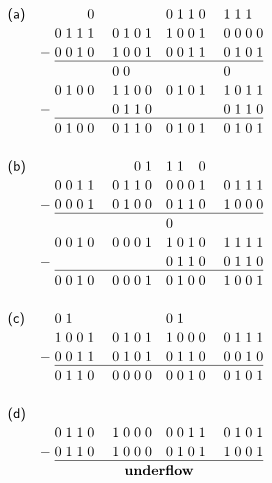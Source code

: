 \[
\setlength\extrarowheight{4pt}
\renewcommand\arraystretch{0.85}
\begin{array}{lr@{\;}c@{\;}c@{\;}c@{\;}c@{\;}cc@{\;}c@{\;}c@{\;}cc@{}c@{\;}c@{\;}c@{\;}c@{\;}cc@{\;}c@{\;}c@{\;}c@{}}
\textsf{(a)} &   &  & & &0 & &  & & &  & & 0&1&1&0 & & 1&1&1&\\
             &   & 0&1&1&1 & & 0&1&0&1 & & 1&0&0&1 & & 0&0&0&0\\
             & - & 0&0&1&0 & & 1&0&0&1 & & 0&0&1&1 & & 0&1&0&1\\
\cline{3-21}
             &   &  & & &  & & 0&0& &  & &  & & &  & & 0& & &\\
             &   & 0&1&0&0 & & 1&1&0&0 & & 0&1&0&1 & & 1&0&1&1\\
             & - &  & & &  & & 0&1&1&0 & &  & & &  & & 0&1&1&0\\
\cline{3-21}
             &   & 0&1&0&0 & & 0&1&1&0 & & 0&1&0&1 & & 0&1&0&1\\\\
\textsf{(b)} &   &  & & &  & &  & &0&1 & & 1&1& &0 & &  & & &\\
             &   & 0&0&1&1 & & 0&1&1&0 & & 0&0&0&1 & & 0&1&1&1\\
             & - & 0&0&0&1 & & 0&1&0&0 & & 0&1&1&0 & & 1&0&0&0\\
\cline{3-21}
             &   &  & & &  & &  & & &  & & 0& & &  & &  & & &\\
             &   & 0&0&1&0 & & 0&0&0&1 & & 1&0&1&0 & & 1&1&1&1\\
             & - &  & & &  & &  & & &  & & 0&1&1&0 & & 0&1&1&0\\
\cline{3-21}
             &   & 0&0&1&0 & & 0&0&0&1 & & 0&1&0&0 & & 1&0&0&1\\\\
\textsf{(c)} &   & 0&1& &  & &  & & &  & & 0&1& &  & &  & & &\\
             &   & 1&0&0&1 & & 0&1&0&1 & & 1&0&0&0 & & 0&1&1&1\\
             & - & 0&0&1&1 & & 0&1&0&1 & & 0&1&1&0 & & 0&0&1&0\\
\cline{3-21}
             &   & 0&1&1&0 & & 0&0&0&0 & & 0&0&1&0 & & 0&1&0&1\\\\
\textsf{(d)}\\
             &   & 0&1&1&0 & & 1&0&0&0 & & 0&0&1&1 & & 0&1&0&1\\
             & - & 0&1&1&0 & & 1&0&0&0 & & 0&1&0&1 & & 1&0&0&1\\
\cline{3-21}
             &   & \multicolumn{19}{c}{\textbf{underflow}}
\end{array}
\]
